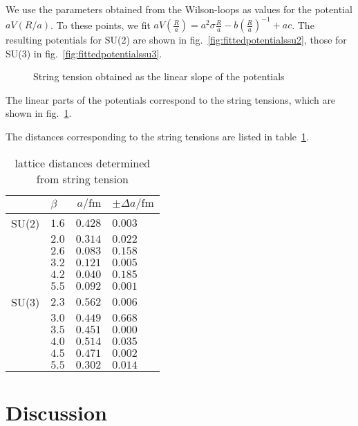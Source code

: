 \documentclass[%
 reprint,
 amsmath,amssymb,
 aps,
]{revtex4-1}
\begin{document}
We use the parameters obtained from the Wilson-loops as values for the potential $aV(R/a)$. To these points, we fit $aV\left(\frac{R}{a}\right)=a^2\sigma \frac{R}{a}-b\left(\frac{R}{a}\right)^{-1}+ac$. The resulting potentials for SU(2) are shown in fig.~\ref{fig:fittedpotentialssu2}, those for SU(3) in fig.~\ref{fig:fittedpotentialssu3}.


\begin{figure}
	\centering
	
	\caption[String tension obtained from potential]{String tension obtained as the linear slope of the potentials}
	\label{fig:stringtension}
\end{figure}

The linear parts of the potentials correspond to the string tensions, which are shown in fig.~\ref{fig:stringtension}.

The distances corresponding to the string tensions are listed in table~\ref{tab:scalesetting}.

\begin{table}
	\centering
	\begin{tabular}{|r|l|r|l|}
		\hline
		&$\beta$&$a/\si{\femto\meter}$&$\pm\Delta a/\si{\femto\meter}$\\
		\hline
SU(2)	&$1.6$	&$0.428$	&$0.003$\\
		&$2.0$	&$0.314$	&$0.022$\\
		&$2.6$	&$0.083$	&$0.158$\\
		&$3.2$	&$0.121$	&$0.005$\\
		&$4.2$	&$0.040$	&$0.185$\\
		&$5.5$	&$0.092$	&$0.001$\\
		\hline
SU(3) 	&$2.3$	&$0.562$	&$0.006$\\
		&$3.0$	&$0.449$	&$0.668$\\
		&$3.5$	&$0.451$	&$0.000$\\
		&$4.0$	&$0.514$	&$0.035$\\
		&$4.5$	&$0.471$	&$0.002$\\
		&$5.5$	&$0.302$	&$0.014$\\
		\hline
\end{tabular}
\caption{lattice distances determined from string tension}
\label{tab:scalesetting}
\end{table}


\section{Discussion}
\end{document}
